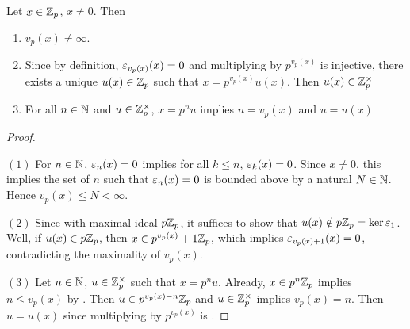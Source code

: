 \begin{prop}
  
  Let $x \in \mathbb{Z}_p$, $x \neq 0$. 
  Then \begin{enumerate}
    \item $v_p(x) \neq \infty$. 
    \item Since by definition, $\varepsilon_{v_p(x)}(x) = 0$ and 
    multiplying by $p^{v_p(x)}$ is injective, 
    there exists a unique $u(x) \in \mathbb{Z}_p$ such that $x = p^{v_p(x)}u(x)$.
    Then $u(x) \in \mathbb{Z}_p^\times$
    \item For all $n \in \mathbb{N}$ and $u \in \mathbb{Z}_p^\times$, 
    $x = p^n u$ implies $n = v_p(x)$ and $u = u(x)$
  \end{enumerate}
\end{prop}
\begin{proof}~

  $(1)$ For $n \in \mathbb{N}$, $\varepsilon_n(x) = 0$ implies for all $k \leq n$, 
  $\varepsilon_k(x) = 0$. 
  Since $x \neq 0$, this implies the set of $n$ such that 
  $\varepsilon_n(x) = 0$ is bounded above by a natural $N \in \mathbb{N}$. 
  Hence $v_p(x) \leq N < \infty$. 
  
  $(2)$ Since  with 
  maximal ideal $p\mathbb{Z}_p$, it suffices to show that 
  $u(x) \notin p\mathbb{Z}_p = \ker\varepsilon_1$. 
  Well, if $u(x) \in p\mathbb{Z}_p$, then $x \in p^{v_p(x)}+1\mathbb{Z}_p$, 
  which implies $\varepsilon_{v_p(x) + 1}(x) = 0$, 
  contradicting the maximality of $v_p(x)$. 

  $(3)$ Let $n \in \mathbb{N}$, $u \in \mathbb{Z}_p^\times$ such that $x = p^n u$. 
  Already, $x \in p^n\mathbb{Z}_p$ implies $n \leq v_p(x)$ by 
  . 
  Then $u \in p^{v_p(x) - n}\mathbb{Z}_p$ and $u \in \mathbb{Z}_p^\times$
  implies $v_p(x) = n$. 
  Then $u = u(x)$ since multiplying by $p^{v_p(x)}$ is 
  . 
\end{proof}

